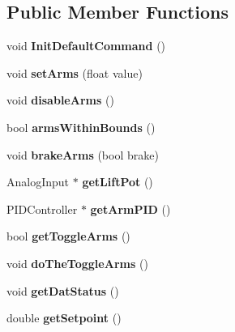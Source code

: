 \subsection*{Public Member Functions}
\begin{DoxyCompactItemize}
\item 
\hypertarget{class_can_collecterino_a25f7c7e5898c30724ae1bf47a7b38e10}{}void {\bfseries Init\+Default\+Command} ()\label{class_can_collecterino_a25f7c7e5898c30724ae1bf47a7b38e10}

\item 
\hypertarget{class_can_collecterino_a2335715a8e197011cfd483302011f8e8}{}void {\bfseries set\+Arms} (float value)\label{class_can_collecterino_a2335715a8e197011cfd483302011f8e8}

\item 
\hypertarget{class_can_collecterino_a60a79346dbaf1d987aba9ef2c950afb4}{}void {\bfseries disable\+Arms} ()\label{class_can_collecterino_a60a79346dbaf1d987aba9ef2c950afb4}

\item 
\hypertarget{class_can_collecterino_adc9e17256b4a00fede2ed7762aeb03c6}{}bool {\bfseries arms\+Within\+Bounds} ()\label{class_can_collecterino_adc9e17256b4a00fede2ed7762aeb03c6}

\item 
\hypertarget{class_can_collecterino_afceae0f9c91f4301137d8e2904e11ae8}{}void {\bfseries brake\+Arms} (bool brake)\label{class_can_collecterino_afceae0f9c91f4301137d8e2904e11ae8}

\item 
\hypertarget{class_can_collecterino_a0eff9a330a430c233b5ae7f72ec13d8b}{}Analog\+Input $\ast$ {\bfseries get\+Lift\+Pot} ()\label{class_can_collecterino_a0eff9a330a430c233b5ae7f72ec13d8b}

\item 
\hypertarget{class_can_collecterino_ad955ee01debe943bf9e749a5bee0b9ef}{}P\+I\+D\+Controller $\ast$ {\bfseries get\+Arm\+P\+I\+D} ()\label{class_can_collecterino_ad955ee01debe943bf9e749a5bee0b9ef}

\item 
\hypertarget{class_can_collecterino_a923a76084bdec56e4e7ad7f8da0842ad}{}bool {\bfseries get\+Toggle\+Arms} ()\label{class_can_collecterino_a923a76084bdec56e4e7ad7f8da0842ad}

\item 
\hypertarget{class_can_collecterino_a62ef9056b5efd3bb50a1bc5fd60b1b05}{}void {\bfseries do\+The\+Toggle\+Arms} ()\label{class_can_collecterino_a62ef9056b5efd3bb50a1bc5fd60b1b05}

\item 
\hypertarget{class_can_collecterino_a66118988ad6367103a511e7bbf0a8a52}{}void {\bfseries get\+Dat\+Status} ()\label{class_can_collecterino_a66118988ad6367103a511e7bbf0a8a52}

\item 
\hypertarget{class_can_collecterino_a6591ee572d092a4015a7351dfe41fab8}{}double {\bfseries get\+Setpoint} ()\label{class_can_collecterino_a6591ee572d092a4015a7351dfe41fab8}

\end{DoxyCompactItemize}


